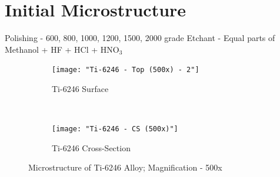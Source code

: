 \documentclass[11pt,letterpaper]{article}
\newcommand{\workingDate}{\textsc{2017 $|$ August $|$ 11}}
\begin{document}
\newpage
\renewcommand{\workingDate}{\textsc{2017 $|$ August $|$ 14}}
\section*{Initial Microstructure}
Polishing - 600, 800, 1000, 1200, 1500, 2000 grade
Etchant - Equal parts of Methanol + HF + HCl + HNO$_{3}$

\begin{figure}[H]
    \centering
    \begin{subfigure}{0.49\textwidth}
        \texttt{[image: "Ti-6246 - Top (500x) - 2"]}
        \caption{Ti-6246 Surface}
        \label{fig:2a}
    \end{subfigure}
    ~
    \begin{subfigure}{0.49\textwidth}
        \texttt{[image: "Ti-6246 - CS (500x)"]}
        \caption{Ti-6246 Cross-Section}
        \label{fig:2b}
    \end{subfigure}
    \caption{Microstructure of Ti-6246 Alloy; Magnification - 500x}
    \label{fig:As-Received}
\end{figure}
\end{document}
